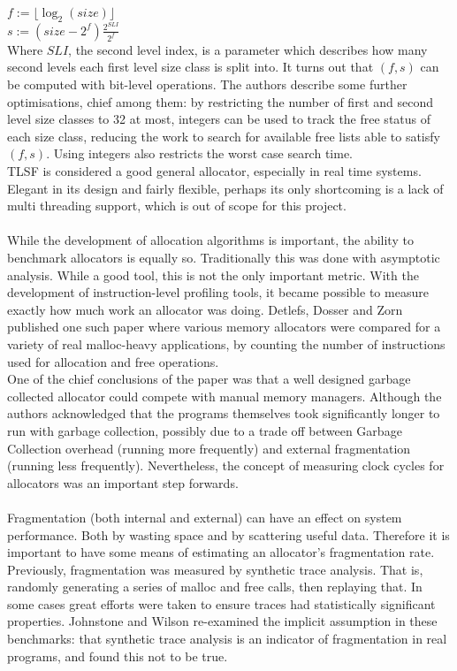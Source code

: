 \documentclass{article}
\begin{document}
$f := \lfloor\log_2\left(size\right)\rfloor$\\
$s := \left(size - 2^f\right) \frac{2^{SLI}}{2^f}$\\
Where $SLI$, the second level index, is a parameter which describes how many second levels each first level size class is split into. It turns out that $\left(f, s\right)$ can be computed with bit-level operations. The authors describe some further optimisations, chief among them: by restricting the number of first and second level size classes to 32 at most, integers can be used to track the free status of each size class, reducing the work to search for available free lists able to satisfy $\left(f, s\right)$. Using integers also restricts the worst case search time.\\
TLSF is considered a good general allocator, especially in real time systems. Elegant in its design and fairly flexible, perhaps its only shortcoming is a lack of multi threading  support, which is out of scope for this project.\\
\\
While the development of allocation algorithms is important, the ability to benchmark allocators is equally so. Traditionally this was done with asymptotic analysis. While a good tool, this is not the only important metric. With the development of instruction-level profiling tools, it became possible to measure exactly how much work an allocator was doing. Detlefs, Dosser and Zorn \cite{10.1002/spe.4380240602} published one such paper where various memory allocators were compared for a variety of real malloc-heavy applications, by counting the number of instructions used for allocation and free operations.\\
One of the chief conclusions of the paper was that a well designed garbage collected allocator could compete with manual memory managers. Although the authors acknowledged that the programs themselves took significantly longer to run with garbage collection, possibly due to a trade off between Garbage Collection overhead (running more frequently) and external fragmentation (running less frequently). Nevertheless, the concept of measuring clock cycles for allocators was an important step forwards.\\
\\
Fragmentation (both internal and external) can have an effect on system performance. Both by wasting space and by scattering useful data. Therefore it is important to have some means of estimating an allocator's fragmentation rate. Previously, fragmentation was measured by synthetic trace analysis. That is, randomly generating a series of malloc and free calls, then replaying that. In some cases great efforts were taken to ensure traces had statistically significant properties. Johnstone and Wilson \cite{10.1145/301589.286864} re-examined the implicit assumption in these benchmarks: that synthetic trace analysis is an indicator of fragmentation in real programs, and found this not to be true.\\
\end{document}
